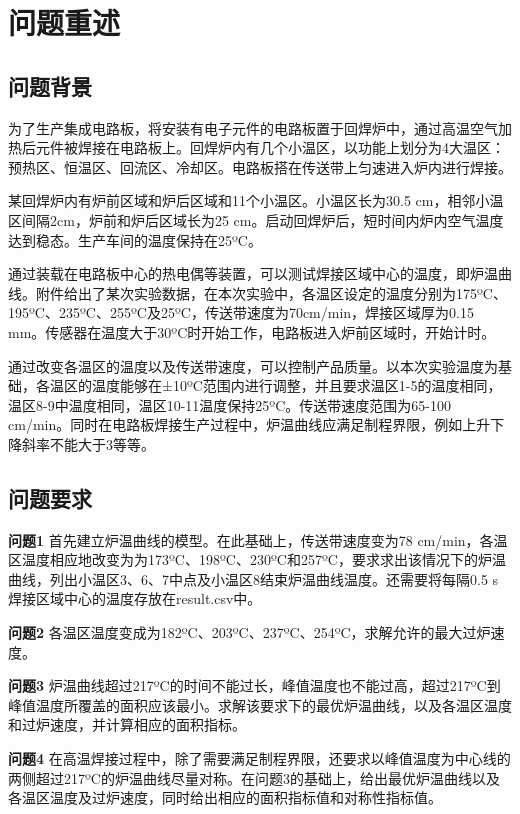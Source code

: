 \documentclass[withoutpreface,bwprint]{cumcmthesis} %
\begin{document}
	
	
	\section{问题重述}
	\subsection{问题背景}
	为了生产集成电路板，将安装有电子元件的电路板置于回焊炉中，通过高温空气加热后元件被焊接在电路板上。回焊炉内有几个小温区，以功能上划分为4大温区：预热区、恒温区、回流区、冷却区。电路板搭在传送带上匀速进入炉内进行焊接。
	
	某回焊炉内有炉前区域和炉后区域和11个小温区。小温区长为30.5 cm，相邻小温区间隔2cm，炉前和炉后区域长为25 cm。启动回焊炉后，短时间内炉内空气温度达到稳态。生产车间的温度保持在25ºC。
	
	通过装载在电路板中心的热电偶等装置，可以测试焊接区域中心的温度，即炉温曲线。附件给出了某次实验数据，在本次实验中，各温区设定的温度分别为175ºC、195ºC、235ºC、255ºC及25ºC，传送带速度为70cm/min，焊接区域厚为0.15 mm。传感器在温度大于30ºC时开始工作，电路板进入炉前区域时，开始计时。
	
	通过改变各温区的温度以及传送带速度，可以控制产品质量。以本次实验温度为基础，各温区的温度能够在±10ºC范围内进行调整，并且要求温区1-5的温度相同，温区8-9中温度相同，温区10-11温度保持25ºC。传送带速度范围为65-100 cm/min。同时在电路板焊接生产过程中，炉温曲线应满足制程界限，例如上升下降斜率不能大于3等等。
	\subsection{问题要求}
	
	\textbf{问题1}  首先建立炉温曲线的模型。在此基础上，传送带速度变为78 cm/min，各温区温度相应地改变为为173ºC、198ºC、230ºC和257ºC，要求求出该情况下的炉温曲线，列出小温区3、6、7中点及小温区8结束炉温曲线温度。还需要将每隔0.5 s焊接区域中心的温度存放在result.csv中。
	
	\textbf{问题2}  各温区温度变成为182ºC、203ºC、237ºC、254ºC，求解允许的最大过炉速度。
	
	\textbf{问题3} 炉温曲线超过217ºC的时间不能过长，峰值温度也不能过高，超过217ºC到峰值温度所覆盖的面积应该最小。求解该要求下的最优炉温曲线，以及各温区温度和过炉速度，并计算相应的面积指标。
	
	
	\textbf{问题4}  在高温焊接过程中，除了需要满足制程界限，还要求以峰值温度为中心线的两侧超过217ºC的炉温曲线尽量对称。在问题3的基础上，给出最优炉温曲线以及各温区温度及过炉速度，同时给出相应的面积指标值和对称性指标值。
	
\end{document}
